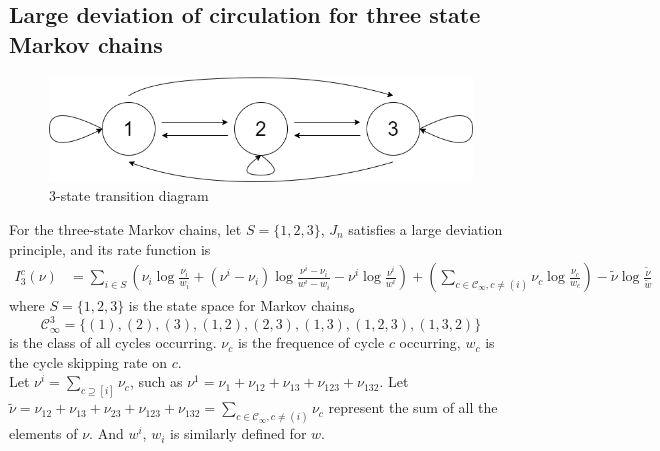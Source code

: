 \documentclass[11pt,en,cite=authoryear]{elegantpaper}
\begin{document}
\subsection{Large deviation of circulation for three state Markov chains}

\begin{theorem}
    \begin{figure}[h]
        \centering
        \includegraphics[scale=0.3]{3-state.png}
        \caption{3-state transition diagram}
    \end{figure}

For the three-state Markov chains, let $S = \{1, 2, 3\}$, $J_{n}$ satisfies a large deviation principle, and its rate function is
\begin{align*}
    I_3^c(\nu) &=
    \sum_{i\in S} \left(\nu_{i}\log \frac{\nu_{i}}{w_i} + (\nu^i - \nu_i)\log \frac{\nu^i - \nu_i}{w^i - w_i} 
    - \nu^i \log \frac{\nu^i}{w^i} \right)
    + \left(\sum_{c \in \mathcal{C}_{\infty}, c\neq (i)} \nu_{c} \log \frac{\nu_{c}}{w_c} \right)
    -\tilde{\nu}\log \frac{\tilde{\nu} }{\tilde{w} }
\end{align*}
where $S=\{1, 2, 3\}$ is the state space for Markov chains。
$$\mathcal{C}_{\infty}^3 = \{(1), (2), (3), (1,2), (2,3), (1,3), (1,2,3), (1,3,2)\}$$
is the class of all cycles occurring.
$\nu_c$ is the frequence of cycle $c$ occurring, $w_c$ is the cycle skipping rate on $c$.\\
Let $\nu^{i} = \sum_{c \supseteq [i]} \nu_{c}$, such as $\nu^{1} = \nu_{1} + \nu_{12} + \nu_{13} + \nu_{123} +\nu_{132}$.
Let  $\tilde{\nu} = \nu_{12} + \nu_{13} + \nu_{23} + \nu_{123} +\nu_{132}=\sum_{c \in \mathcal{C}_{\infty}, c\neq (i)} \nu_{c}$ represent the sum of all the elements of $\nu$. 
And $w^i$, $w_i$ is similarly defined for $w$.
\end{theorem}
\end{document}
